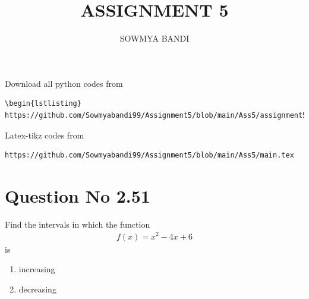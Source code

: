 \documentclass[journal,12pt,twocolumn]{IEEEtran}
\begin{document}
     \def\rightbox#1{\makebox[0in][r]{#1}}
     \def\centbox#1{\makebox[0in]{#1}}
     \def\topbox#1{\raisebox{-\baselineskip}[0in][0in]{#1}}
     \def\midbox#1{\raisebox{-0.5\baselineskip}[0in][0in]{#1}}
\vspace{3cm}
\title{ASSIGNMENT 5}
\author{SOWMYA BANDI}
\maketitle
\newpage
\bigskip
\renewcommand{\thefigure}{\theenumi}
\renewcommand{\thetable}{\theenumi}
Download all python codes from 
\begin{lstlisting}
\begin{lstlisting}
https://github.com/Sowmyabandi99/Assignment5/blob/main/Ass5/assignment5.py
\end{lstlisting}
%
Latex-tikz codes from 
%
\begin{lstlisting}
https://github.com/Sowmyabandi99/Assignment5/blob/main/Ass5/main.tex
\end{lstlisting}
%
\section{Question No 2.51}
Find the intervals in which the function 
\begin{align}
f(x) = x^2-4x+6 
\end{align}
%
is
%
\begin{enumerate}
\item increasing
\item decreasing
\end{enumerate}
%
\end{document}
